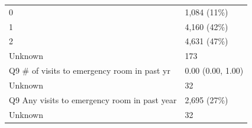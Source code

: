 \documentclass[]{article}
\begin{document}
\begin{longtable}[]{@{}ll@{}}
\begin{minipage}[t]{0.71\columnwidth}
0\strut
\end{minipage} & \begin{minipage}[t]{0.23\columnwidth}\raggedright
1,084 (11\%)\strut
\end{minipage}\tabularnewline
\begin{minipage}[t]{0.71\columnwidth}\raggedright
1\strut
\end{minipage} & \begin{minipage}[t]{0.23\columnwidth}\raggedright
4,160 (42\%)\strut
\end{minipage}\tabularnewline
\begin{minipage}[t]{0.71\columnwidth}\raggedright
2\strut
\end{minipage} & \begin{minipage}[t]{0.23\columnwidth}\raggedright
4,631 (47\%)\strut
\end{minipage}\tabularnewline
\begin{minipage}[t]{0.71\columnwidth}\raggedright
Unknown\strut
\end{minipage} & \begin{minipage}[t]{0.23\columnwidth}\raggedright
173\strut
\end{minipage}\tabularnewline
\begin{minipage}[t]{0.71\columnwidth}\raggedright
Q9 \# of visits to emergency room in past yr\strut
\end{minipage} & \begin{minipage}[t]{0.23\columnwidth}\raggedright
0.00 (0.00, 1.00)\strut
\end{minipage}\tabularnewline
\begin{minipage}[t]{0.71\columnwidth}\raggedright
Unknown\strut
\end{minipage} & \begin{minipage}[t]{0.23\columnwidth}\raggedright
32\strut
\end{minipage}\tabularnewline
\begin{minipage}[t]{0.71\columnwidth}\raggedright
Q9 Any visits to emergency room in past year\strut
\end{minipage} & \begin{minipage}[t]{0.23\columnwidth}\raggedright
2,695 (27\%)\strut
\end{minipage}\tabularnewline
\begin{minipage}[t]{0.71\columnwidth}\raggedright
Unknown\strut
\end{minipage} & \begin{minipage}[t]{0.23\columnwidth}\raggedright
32\strut
\end{minipage}\tabularnewline

\end{longtable}
\end{document}
